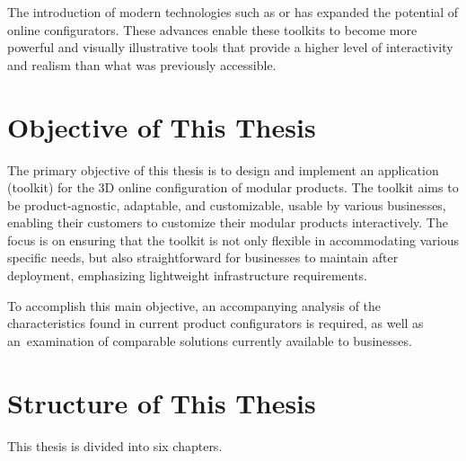 The introduction of modern technologies such as  or  has expanded the potential of online configurators. These advances enable these toolkits to become more powerful and visually illustrative tools that provide a higher level of interactivity and realism than what was previously accessible.~\cite{Cozzi2015}

\section*{Objective of This Thesis}

The primary objective of this thesis is to design and implement an application (toolkit) for the 3D online configuration of modular products. The toolkit aims to be product-agnostic, adaptable, and customizable, usable by various businesses, enabling their customers to customize their modular products interactively. The focus is on ensuring that the toolkit is not only flexible in accommodating various specific needs, but also straightforward for businesses to maintain after deployment, emphasizing lightweight infrastructure requirements. 

To accomplish this main objective, an accompanying analysis of the characteristics found in current product configurators is required, as well as an~examination of comparable solutions currently available to businesses.

\section*{Structure of This Thesis}

This thesis is divided into six chapters.

